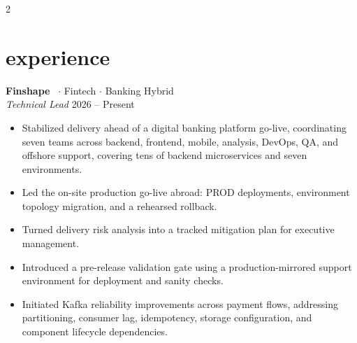 \documentclass[10pt]{article}
\newcommand{\companyentry}[3]{%
\textbf{#1}%
\if\relax\detokenize{#2}\relax\else\ $\cdot$ #2\fi%
\hfill #3%
}
\newcommand{\roleentry}[2]{%
\textit{#1} \hfill #2%
}
\begin{document}
\begin{paracol}{2}


\section{experience}

\companyentry{Finshape}{Fintech $\cdot$ Banking}{Hybrid}\\[2pt]

\roleentry{Technical Lead}{2026 -- Present}
\begin{itemize}[noitemsep,leftmargin=3.5mm,rightmargin=0mm,topsep=3pt]
  \item Stabilized delivery ahead of a digital banking platform go-live, coordinating seven teams across backend,
  frontend, mobile, analysis, DevOps, QA, and offshore support, covering tens of backend microservices and seven
  environments.
  \item Led the on-site production go-live abroad: PROD deployments, environment topology migration, and a rehearsed
  rollback.
  \item Turned delivery risk analysis into a tracked mitigation plan for executive management.
  \item Introduced a pre-release validation gate using a production-mirrored support environment for deployment and
  sanity checks.
  \item Initiated Kafka reliability improvements across payment flows, addressing partitioning, consumer lag,
  idempotency, storage configuration, and component lifecycle dependencies.
\end{itemize}

\vspace{4pt}


\end{paracol}
\end{document}

